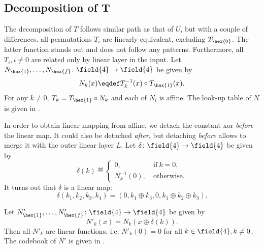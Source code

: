 \subsection{Decomposition of T}

The decomposition of $T$ follows similar path as that of $U$, but with a couple of differences. all permutations $T_i$ are linearly-equivalent, excluding $T_{\hex{0}}$. The latter function stands out and does not follow any patterns. Furthermore, all $T_i,i \ne 0$ are related only by linear layer in the input. Let $N_{\hex{1}},\ldots,N_{\hex{f}}\colon \field{4} \to \field{4}$ be given by
$$
N_k(x) \eqdef T_k^{-1}(x) \circ T_{\hex{1}}(x).
$$
For any $k \ne 0$, $T_k = T_{\hex{1}} \circ N_k$ and each of $N_i$ is affine. The look-up table of $N$ is given in .

In order to obtain linear mapping from affine, we detach the constant xor \emph{before} the linear map. It could also be detached \emph{after}, but detaching \emph{before} allows to merge it with the outer linear layer $L$. Let $\delta\colon \field{4} \to \field{4}$ be given by
$$
\delta(k) \eqdef \begin{cases}
    0, &~\text{if}~k = 0,\\
    N_k^{-1}(0), &~\text{otherwise}.
\end{cases}
$$
It turns out that $\delta$ is a linear map:
$$
\delta(k_1, k_2, k_3, k_4) = (0, k_1 \oplus k_3, 0, k_1 \oplus k_2 \oplus k_3).
$$

Let $N'_{\hex{1}},\ldots,N'_{\hex{f}}\colon \field{4} \to \field{4}$ be given by
$$
N'_k(x) = N_k(x \oplus \delta(k)).
$$
Then all $N'_k$ are linear functions, i.e. $N'_k(0) = 0$ for all $k \in \field{4},k\ne 0$. The codebook of $N'$ is given in .


